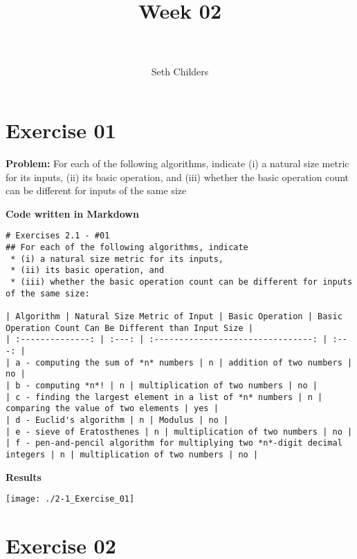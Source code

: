 \documentclass[paper=a4, fontsize=11pt]{scrartcl} %
\title{	
\normalfont \normalsize 
\horrule{0.5pt} \\[0.4cm] %
\huge Week 02 \\ %
\horrule{2pt} \\[0.5cm] %
}
\author{Seth Childers} %
\date{} %
\numberwithin{equation}{section}
\numberwithin{figure}{section}
\numberwithin{table}{section}
\begin{document}
\maketitle %


\section{Exercise 01}

\textbf{Problem:} For each of the following algorithms, indicate 
 (i) a natural size metric for its inputs, 
 (ii) its basic operation, and 
 (iii) whether the basic operation count can be different for inputs of the same size

\bigskip
\textbf{Code written in Markdown}
\begin{lstlisting}
# Exercises 2.1 - #01
## For each of the following algorithms, indicate 
 * (i) a natural size metric for its inputs, 
 * (ii) its basic operation, and 
 * (iii) whether the basic operation count can be different for inputs of the same size:

| Algorithm | Natural Size Metric of Input | Basic Operation | Basic Operation Count Can Be Different than Input Size |
| :--------------: | :---: | :--------------------------------: | :---: |
| a - computing the sum of *n* numbers | n | addition of two numbers | no |
| b - computing *n*! | n | multiplication of two numbers | no |
| c - finding the largest element in a list of *n* numbers | n | comparing the value of two elements | yes |
| d - Euclid's algorithm | n | Modulus | no |
| e - sieve of Eratosthenes | n | multiplication of two numbers | no |
| f - pen-and-pencil algorithm for multiplying two *n*-digit decimal integers | n | multiplication of two numbers | no |
\end{lstlisting}

\pagebreak
\textbf{Results}

\texttt{[image: ./2-1\_Exercise\_01]}
\pagebreak


\section{Exercise 02}
\end{document}
